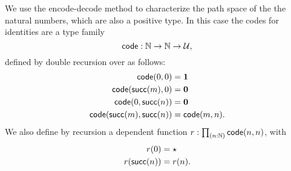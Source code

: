 We use the encode-decode method to characterize the path space of the the natural numbers, which are also a positive type.
In this case the codes for identities are a type family
\[\mathsf{code}:\mathbb{N}\to\mathbb{N}\to\mathcal{U},\]
defined by double recursion over \N as follows:
\begin{align*}
  \mathsf{code}(0,0) &= \mathbf{1}\\
  \mathsf{code}(\mathsf{succ}(m),0) &= \mathbf{0}\\
  \mathsf{code}(0,\mathsf{succ}(n)) &= \mathbf{0}\\
  \mathsf{code}(\mathsf{succ}(m),\mathsf{succ}(n)) &= \mathsf{code}(m,n).
\end{align*}
We also define by recursion a dependent function $r:\prd{n:\N} \code(n,n)$, with
\begin{align*}
  r(0) &= \star\\
  r(\mathsf{succ}(n)) &= r(n).
\end{align*}

